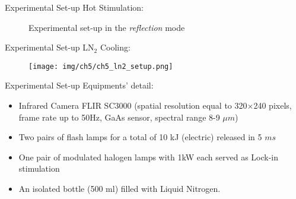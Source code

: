 \begin{frame}{Experimental Set-up}
    Hot Stimulation:
    \begin{figure}
        \centering
       \caption{Experimental set-up in the \textit{reflection} mode}
    \end{figure}

\end{frame}


\begin{frame}{Experimental Set-up}
    LN$_2$ Cooling:
    \begin{figure}
        \centering
        \texttt{[image: img/ch5/ch5\_ln2\_setup.png]}
    \end{figure}

\end{frame}


\begin{frame}{Experimental Set-up}
    Equipments' detail:
    \begin{itemize}
        \item Infrared Camera FLIR SC3000 (spatial resolution equal to 320$\times$240 pixels, frame rate up to 50Hz, GaAs sensor, spectral range 8-9 $\mu m$)
        \item Two pairs of flash lamps for a total of 10 kJ (electric) released in 5 $ms $ 
        \item One pair of modulated halogen lamps with 1kW each served as Lock-in    stimulation   
        \item An isolated bottle (500 ml) filled with  Liquid Nitrogen.
\end{itemize}
\end{frame}




